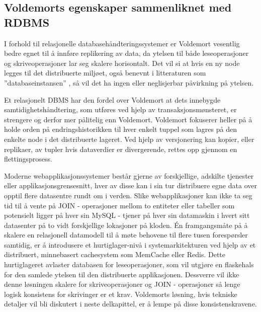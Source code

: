 
\subsection{Voldemorts egenskaper sammenliknet med RDBMS}
I forhold til relasjonelle databasehåndteringssystemer er Voldemort vesentlig bedre egnet til å innføre replikering av data, da ytelsen til både leseoperasjoner og skriveoperasjoner lar seg skalere horisontalt. Det vil si at hvis en ny node legges til det distribuerte miljøet, også benevnt i litteraturen som ''databaseinstansen'' \citep{sadalage2013}, så vil det ha ingen eller neglisjerbar påvirkning på ytelsen. 

Et relasjonelt DBMS har den fordel over Voldemort at dets innebygde samtidighetshåndtering, som utføres ved hjelp av transaksjonsmønsteret, er strengere og derfor mer pålitelig enn Voldemort. Voldemort fokuserer heller på å holde orden på endringshistorikken til hver enkelt tuppel som lagres på den enkelte node i det distribuerte lageret. Ved hjelp av versjonering kan kopier, eller replikaer, av tupler hvis dataverdier er divergerende, rettes opp gjennom en flettingsprosess.

Moderne webapplikasjonssystemer består gjerne av forskjellige, adskilte tjenester eller applikasjonsgrensesnitt, hver av disse kan i sin tur distribuere egne data over opptil flere datasentre rundt om i verden. Slike webapplikasjoner kan ikke ta seg tid til å vente på JOIN - operasjoner mellom to entiteter eller tabeller som potensielt ligger på hver sin MySQL - tjener på hver sin datamaskin i hvert sitt datasenter på to vidt forskjellige lokasjoner på kloden. Én framgangsmåte på å skalere en relasjonell datamodell til å møte behovene til flere tusen forespørsler samtidig, er å introdusere et hurtiglager-nivå i systemarkitekturen ved hjelp av et distribuert, minnebasert cachesystem som MemCache eller Redis. Dette hurtiglageret avlaster databasen for leseoperasjoner, som vil utgjøre en flaskehals for den samlede ytelsen til den distribuerte applikasjonen. Dessverre vil ikke denne løsningen skalere for skriveoperasjoner og JOIN - operasjoner så lenge logisk konsistens for skrivinger er et krav. Voldemorts løsning, hvis tekniske detaljer vil bli diskutert i neste delkapittel, er å lempe på disse konsistenskravene.


